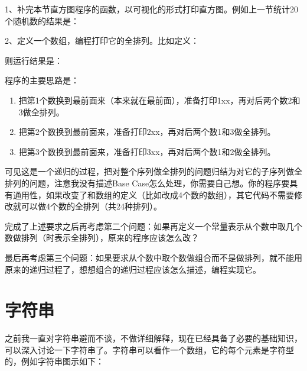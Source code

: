 1、补完本节直方图程序的函数，以可视化的形式打印直方图。例如上一节统计20个随机数的结果是：




2、定义一个数组，编程打印它的全排列。比如定义：




则运行结果是：




程序的主要思路是：


\begin{enumerate}

\item 把第1个数换到最前面来（本来就在最前面），准备打印1xx，再对后两个数2和3做全排列。

\item 把第2个数换到最前面来，准备打印2xx，再对后两个数1和3做全排列。

\item 把第3个数换到最前面来，准备打印3xx，再对后两个数1和2做全排列。
\end{enumerate}


可见这是一个递归的过程，把对整个序列做全排列的问题归结为对它的子序列做全排列的问题，注意我没有描述Base Case怎么处理，你需要自己想。你的程序要具有通用性，如果改变了和数组的定义（比如改成4个数的数组），其它代码不需要修改就可以做4个数的全排列（共24种排列）。



完成了上述要求之后再考虑第二个问题：如果再定义一个常量表示从个数中取几个数做排列（时表示全排列），原来的程序应该怎么改？



最后再考虑第三个问题：如果要求从个数中取个数做组合而不是做排列，就不能用原来的递归过程了，想想组合的递归过程应该怎么描述，编程实现它。




\section{字符串}
%
之前我一直对字符串避而不谈，不做详细解释，现在已经具备了必要的基础知识，可以深入讨论一下字符串了。字符串可以看作一个数组，它的每个元素是字符型的，例如字符串图示如下：



